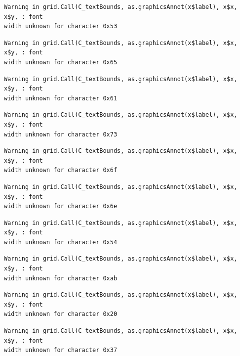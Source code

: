 \documentclass[
  letterpaper,
]{scrbook}
\begin{document}
\begin{verbatim}
Warning in grid.Call(C_textBounds, as.graphicsAnnot(x$label), x$x, x$y, : font
width unknown for character 0x53
\end{verbatim}

\begin{verbatim}
Warning in grid.Call(C_textBounds, as.graphicsAnnot(x$label), x$x, x$y, : font
width unknown for character 0x65
\end{verbatim}

\begin{verbatim}
Warning in grid.Call(C_textBounds, as.graphicsAnnot(x$label), x$x, x$y, : font
width unknown for character 0x61
\end{verbatim}

\begin{verbatim}
Warning in grid.Call(C_textBounds, as.graphicsAnnot(x$label), x$x, x$y, : font
width unknown for character 0x73
\end{verbatim}

\begin{verbatim}
Warning in grid.Call(C_textBounds, as.graphicsAnnot(x$label), x$x, x$y, : font
width unknown for character 0x6f
\end{verbatim}

\begin{verbatim}
Warning in grid.Call(C_textBounds, as.graphicsAnnot(x$label), x$x, x$y, : font
width unknown for character 0x6e
\end{verbatim}

\begin{verbatim}
Warning in grid.Call(C_textBounds, as.graphicsAnnot(x$label), x$x, x$y, : font
width unknown for character 0x54
\end{verbatim}

\begin{verbatim}
Warning in grid.Call(C_textBounds, as.graphicsAnnot(x$label), x$x, x$y, : font
width unknown for character 0xab
\end{verbatim}

\begin{verbatim}
Warning in grid.Call(C_textBounds, as.graphicsAnnot(x$label), x$x, x$y, : font
width unknown for character 0x20
\end{verbatim}

\begin{verbatim}
Warning in grid.Call(C_textBounds, as.graphicsAnnot(x$label), x$x, x$y, : font
width unknown for character 0x37
\end{verbatim}
\end{document}
